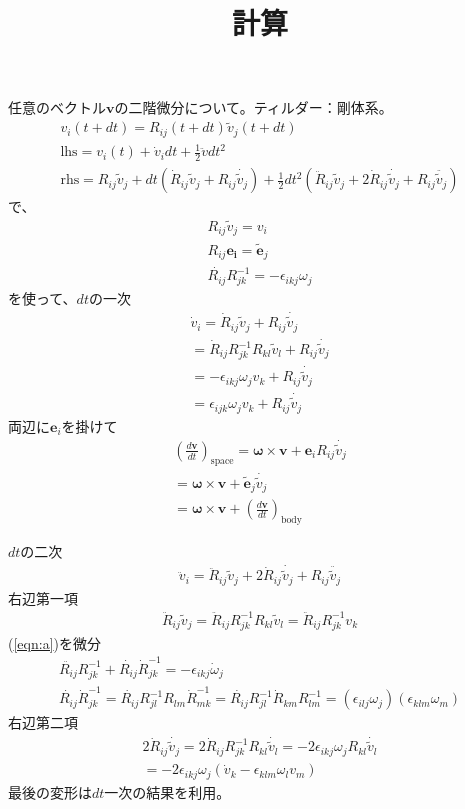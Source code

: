 \documentclass{jarticle}
\title{計算}
\begin{document}
任意のベクトル$\mathbf{v}$の二階微分について。ティルダー：剛体系。
\begin{eqnarray*}
v_i(t+dt) = R_{ij}(t+dt)\tilde{v}_j(t+dt) \\
\mbox{lhs} = v_i(t) + \dot{v}_i dt + \frac{1}{2} \ddot{v} dt^2 \\
\mbox{rhs} = R_{ij}\tilde{v}_j 
+ dt(\dot{R}_{ij}\tilde{v}_j + R_{ij}\dot{\tilde{v}_j})
+\frac{1}{2}dt^2(\ddot{R}_{ij}\tilde{v}_j + 2\dot{R}_{ij}\dot{\tilde{v}_j}+R_{ij}\ddot{\tilde{v}_j})
\end{eqnarray*}
で、
\begin{eqnarray}
R_{ij}\tilde{v}_j = v_i \\
R_{ij}\mathbf{e_i} = \tilde{\mathbf{e}}_j \\
\dot{R_{ij}}R^{-1}_{jk} = -\epsilon_{ikj} \omega_j \label{eqn:a}
\end{eqnarray}
を使って、$dt$の一次
\begin{eqnarray*}
\dot{v}_i = \dot{R}_{ij}\tilde{v}_j + R_{ij}\dot{\tilde{v}_j}\\
=\dot{R}_{ij}R^{-1}_{jk} R_{kl} \tilde{v}_l+ R_{ij}\dot{\tilde{v}_j}\\
=-\epsilon_{ikj}\omega_j v_k + R_{ij}\dot{\tilde{v}_j} \\
=\epsilon_{ijk}\omega_j v_k + R_{ij}\dot{\tilde{v}_j}
\end{eqnarray*}
両辺に$\mathbf{e}_i$を掛けて
\begin{eqnarray*}
\left(\frac{d\mathbf{v}}{dt}\right)_{\mbox{space}}=\mathbf{\omega}\times\mathbf{v} + \mathbf{e}_i R_{ij}\dot{\tilde{v}_j} \\
=\mathbf{\omega}\times\mathbf{v} + \tilde{\mathbf{e}}_j\dot{\tilde{v}_j}\\
=\mathbf{\omega}\times\mathbf{v} + \left(\frac{d\mathbf{v}}{dt}\right)_{\mbox{body}}
\end{eqnarray*}

$dt$の二次
\begin{eqnarray*}
\ddot{v}_i = \ddot{R}_{ij}\tilde{v}_j + 2\dot{R}_{ij}\dot{\tilde{v}_j}+R_{ij}\ddot{\tilde{v}_j}
\end{eqnarray*}
右辺第一項
\begin{eqnarray*}
\ddot{R}_{ij}\tilde{v}_j = \ddot{R}_{ij} R^{-1}_{jk} R_{kl}\tilde{v}_l =
\ddot{R}_{ij} R^{-1}_{jk} v_k
\end{eqnarray*}
(\ref{eqn:a})を微分
\begin{eqnarray*}
\ddot{R_{ij}}R^{-1}_{jk} + \dot{R_{ij}}\dot{R}^{-1}_{jk} = -\epsilon_{ikj} \dot{\omega}_j \\
\dot{R_{ij}}\dot{R}^{-1}_{jk} = \dot{R_{ij}}R^{-1}_{jl}R_{lm}\dot{R}^{-1}_{mk}
= \dot{R_{ij}}R^{-1}_{jl} \dot{R}_{km} R^{-1}_{lm}
= (\epsilon_{ilj}\omega_j)(\epsilon_{klm}\omega_m)
\end{eqnarray*}
右辺第二項
\begin{eqnarray*}
2\dot{R}_{ij}\dot{\tilde{v}_j}=2\dot{R}_{ij} R^{-1}_{jk} R_{kl} \dot{\tilde{v}_l} = -2\epsilon_{ikj}\omega_j R_{kl} \dot{\tilde{v}_l}\\
=-2\epsilon_{ikj}\omega_j (\dot{v}_k-\epsilon_{klm}\omega_l v_m)
\end{eqnarray*}
最後の変形は$dt$一次の結果を利用。
\end{document}

